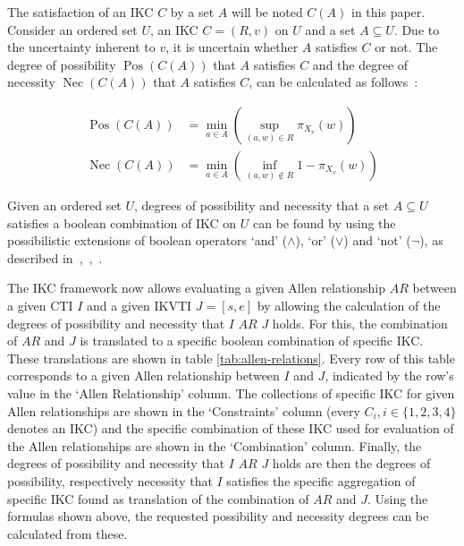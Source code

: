 \documentclass[runningheads,a4paper]{llncs}
\newcommand{\Pos}{\operatorname{Pos}}
\newcommand{\Nec}{\operatorname{Nec}}
\begin{document}
The satisfaction of an IKC $C$ by a set $A$ will be noted $C(A)$ in this paper. Consider an ordered set $U$, an IKC $C = (R,v)$ on $U$ and a set $A \subseteq U$. Due to the uncertainty inherent to $v$, it is uncertain whether $A$ satisfies $C$ or not. The degree of possibility $\Pos(C(A))$ that $A$ satisfies $C$ and the degree of necessity $\Nec(C(A))$ that $A$ satisfies $C$, can be calculated as follows~\cite{Pons2013ijufkbs}:

\vspace{-10pt}
\begin{align}
\Pos(C(A)) & = \min_{a \in A}\left(\sup_{(a,w) \in R}\pi_{X_{v}}(w)\right) \label{ill-known-pos}\\
\Nec(C(A)) & = \min_{a \in A}\left(\inf_{(a,w) \notin R} 1-\pi_{X_{v}}(w)\right) \label{ill-known-nec}
\end{align}

Given an ordered set $U$, degrees of possibility and necessity that a set $A \subseteq U$ satisfies a boolean combination of IKC on $U$ can be found by using the possibilistic extensions of boolean operators `and' ($\wedge$), `or' ($\vee$) and `not' ($\neg$), as described in~\cite{Billiet2012ipmu},~\cite{Pons2012ipmu},~\cite{Pons2013ijufkbs}.

The IKC framework now allows evaluating a given Allen relationship $AR$ between a given CTI $I$ and a given IKVTI $J = \left[s, e\right]$ by allowing the calculation of the degrees of possibility and necessity that $I$ $AR$ $J$ holds. For this, the combination of $AR$ and $J$ is translated to a specific boolean combination of specific IKC. These translations are shown in table \ref{tab:allen-relations}. Every row of this table corresponds to a given Allen relationship between $I$ and $J$, indicated by the row's value in the `Allen Relationship' column. The collections of specific IKC for given Allen relationships are shown in the `Constraints' column (every $C_i, i \in \{1, 2, 3, 4\}$ denotes an IKC) and the specific combination of these IKC used for evaluation of the Allen relationships are shown in the `Combination' column. Finally, the degrees of possibility and necessity that $I$ $AR$ $J$ holds are then the degrees of possibility, respectively necessity that $I$ satisfies the specific aggregation of specific IKC found as translation of the combination of $AR$ and $J$. Using the formulas shown above, the requested possibility and necessity degrees can be calculated from these.
\end{document}
